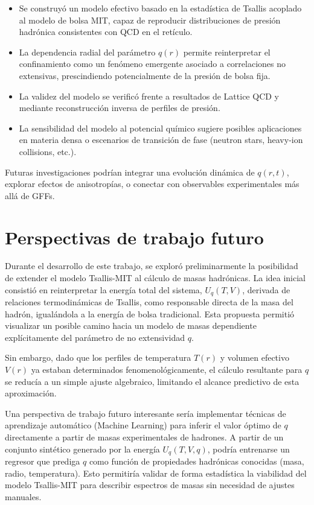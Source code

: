 \begin{itemize}
    \item Se construyó un modelo efectivo basado en la estadística de Tsallis acoplado al modelo de bolsa MIT, capaz de reproducir distribuciones de presión hadrónica consistentes con QCD en el retículo.
    \item La dependencia radial del parámetro \( q(r) \) permite reinterpretar el confinamiento como un fenómeno emergente asociado a correlaciones no extensivas, prescindiendo potencialmente de la presión de bolsa fija.
    \item La validez del modelo se verificó frente a resultados de Lattice QCD y mediante reconstrucción inversa de perfiles de presión.
    \item La sensibilidad del modelo al potencial químico sugiere posibles aplicaciones en materia densa o escenarios de transición de fase (neutron stars, heavy-ion collisions, etc.).
\end{itemize}

\begin{remark}[Perspectivas]
    Futuras investigaciones podrían integrar una evolución dinámica de \( q(r,t) \), explorar efectos de anisotropías, o conectar con observables experimentales más allá de GFFs.
\end{remark}

\section*{Perspectivas de trabajo futuro}

Durante el desarrollo de este trabajo, se exploró preliminarmente la posibilidad de extender el modelo Tsallis-MIT al cálculo de masas hadrónicas. La idea inicial consistió en reinterpretar la energía total del sistema, \( U_q(T,V) \), derivada de relaciones termodinámicas de Tsallis, como responsable directa de la masa del hadrón, igualándola a la energía de bolsa tradicional. Esta propuesta permitió visualizar un posible camino hacia un modelo de masas dependiente explícitamente del parámetro de no extensividad \( q \).

Sin embargo, dado que los perfiles de temperatura \( T(r) \) y volumen efectivo \( V(r) \) ya estaban determinados fenomenológicamente, el cálculo resultante para \( q \) se reducía a un simple ajuste algebraico, limitando el alcance predictivo de esta aproximación.

Una perspectiva de trabajo futuro interesante sería implementar técnicas de aprendizaje automático (Machine Learning) para inferir el valor óptimo de \( q \) directamente a partir de masas experimentales de hadrones. A partir de un conjunto sintético generado por la energía \( U_q(T,V,q) \), podría entrenarse un regresor que prediga \( q \) como función de propiedades hadrónicas conocidas (masa, radio, temperatura). Esto permitiría validar de forma estadística la viabilidad del modelo Tsallis-MIT para describir espectros de masas sin necesidad de ajustes manuales.

